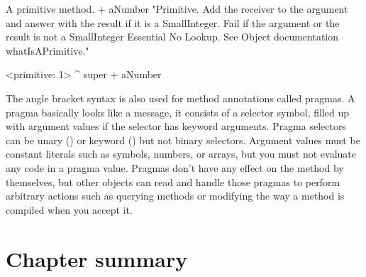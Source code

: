 \documentclass[a4paper,10pt,twoside]{book}
\begin{document}
\begin{method}[primitive]{A primitive method.}
+ aNumber
  "Primitive. Add the receiver to the argument and answer with the result
  if it is a SmallInteger. Fail if the argument or the result is not a
  SmallInteger  Essential  No Lookup. See Object documentation whatIsAPrimitive."

  <primitive: 1>
  ^ super + aNumber
\end{method}





The angle bracket syntax is also used for method annotations called pragmas.
A pragma basically looks like a message, it consists of a selector symbol, filled up with argument values if the selector has keyword arguments.
Pragma selectors can be unary () or keyword () but not binary selectors.
Argument values must be constant literals such as symbols, numbers, or arrays, but you must not evaluate any code in a pragma value.
Pragmas don't have any effect on the method by themselves, but other objects can read and handle those pragmas to perform arbitrary actions such as querying methods or modifying the way a method is compiled when you accept it.

\section{Chapter summary}
\end{document}
